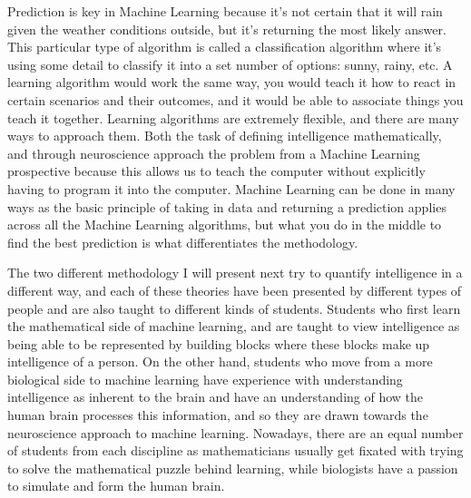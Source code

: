 \documentclass[11pt, oneside]{article}
\begin{document}
\par Prediction is key in Machine Learning because it's not certain that it will rain given the weather conditions outside, but it's returning the most likely answer. This particular type of algorithm is called a classification algorithm where it's using some detail to classify it into a set number of options: sunny, rainy, etc. A learning algorithm would work the same way, you would teach it how to react in certain scenarios and their outcomes, and it would be able to associate things you teach it together. Learning algorithms are extremely flexible, and there are many ways to approach them. Both the task of defining intelligence mathematically, and through neuroscience approach the problem from a Machine Learning prospective because this allows us to teach the computer without explicitly having to program it into the computer. Machine Learning can be done in many ways as the basic principle of taking in data and returning a prediction applies across all the Machine Learning algorithms, but what you do in the middle to find the best prediction is what differentiates the methodology. 

\par The two different methodology I will present next try to quantify intelligence in a different way, and each of these theories have been presented by different types of people and are also taught to different kinds of students. Students who first learn the mathematical side of machine learning, and are taught to view intelligence as being able to be represented by building blocks where these blocks make up intelligence of a person. On the other hand, students who move from a more biological side to machine learning have experience with understanding intelligence as inherent to the brain and have an understanding of how the human brain processes this information, and so they are drawn towards the neuroscience approach to machine learning. Nowadays, there are an equal number of students from each discipline as mathematicians usually get fixated with trying to solve the mathematical puzzle behind learning, while biologists have a passion to simulate and form the human brain.
\end{document}
